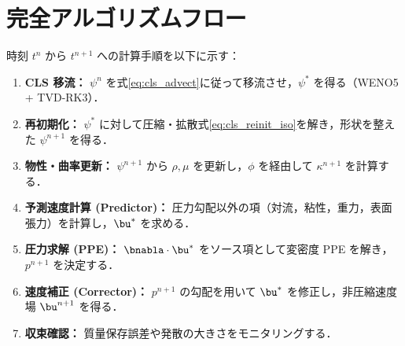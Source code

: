 \section{完全アルゴリズムフロー}
\label{sec:algorithm}

時刻 $t^n$ から $t^{n+1}$ への計算手順を以下に示す：

\begin{enumerate}
  \item \textbf{CLS 移流：} $\psi^n$ を式\eqref{eq:cls_advect}に従って移流させ，$\psi^*$ を得る（WENO5 + TVD-RK3）．
  \item \textbf{再初期化：} $\psi^*$ に対して圧縮・拡散式\eqref{eq:cls_reinit_iso}を解き，形状を整えた $\psi^{n+1}$ を得る．
  \item \textbf{物性・曲率更新：} $\psi^{n+1}$ から $\rho, \mu$ を更新し，$\phi$ を経由して $\kappa^{n+1}$ を計算する．
  \item \textbf{予測速度計算 (Predictor)：} 圧力勾配以外の項（対流，粘性，重力，表面張力）を計算し，$\bu^*$ を求める．
  \item \textbf{圧力求解 (PPE)：} $\bnabla\cdot\bu^*$ をソース項として変密度 PPE を解き，$p^{n+1}$ を決定する．
  \item \textbf{速度補正 (Corrector)：} $p^{n+1}$ の勾配を用いて $\bu^*$ を修正し，非圧縮速度場 $\bu^{n+1}$ を得る．
  \item \textbf{収束確認：} 質量保存誤差や発散の大きさをモニタリングする．
\end{enumerate}
